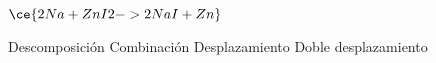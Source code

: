$\ce{2Na + ZnI2 -> 2NaI + Zn}$

\begin{choices}
    \CorrectChoice Descomposición
    \choice Combinación
    \choice Desplazamiento
    \choice Doble desplazamiento
\end{choices}